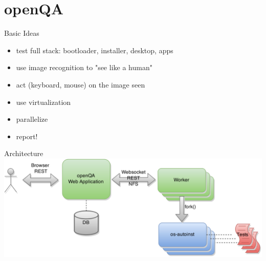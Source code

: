 \documentclass[
]{beamer}
\begin{document}

\section{openQA}

\begin{frame}{Basic Ideas}
  \begin{itemize}
    \item test full stack: bootloader, installer, desktop, apps
    \item use image recognition to "see like a human"
    \item act (keyboard, mouse) on the image seen
    \item use virtualization
    \item parallelize
    \item report!
  \end{itemize}
\end{frame}


\begin{frame}{Architecture}
  \includegraphics[width=.8\paperwidth]{openqa_architecture}
\end{frame}
\end{document}
